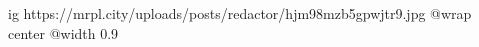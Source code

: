  
 
 
 
 

\ifcmt
  ig https://mrpl.city/uploads/posts/redactor/hjm98mzb5gpwjtr9.jpg
  @wrap center
  @width 0.9
\fi
